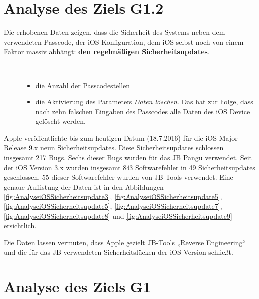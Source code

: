  
\section{Analyse des Ziels G1.2}
\label{sec:AnalyseG12}


Die erhobenen Daten zeigen, dass die Sicherheit des Systems neben dem verwendeten Passcode, der iOS Konfiguration, dem iOS selbst noch von einem Faktor massiv abhängt: \textbf{den regelmäßigen Sicherheitsupdates}.  
\begin{description}
    \item[\parbox{\textwidth} {Bei der Konfiguration sind folgende Konfigurationsparameter anzuführen}]~\par
    \begin{itemize}
       \item die Anzahl der Passcodestellen
       \item die Aktivierung des Parameters \textit{\glqq Daten löschen\grqq{}}. Das hat zur Folge, dass nach zehn falschen Eingaben des Passcodes alle Daten des iOS Device gelöscht werden.
    \end{itemize}
\end{description} 

Apple veröffentlichte bis zum heutigen Datum (18.7.2016) für die iOS Major Release 9.x neun Sicherheitsupdates. Diese Sicherheitsupdates schlossen insgesamt 217 Bugs. Sechs dieser Bugs wurden für das JB Pangu verwendet.  Seit der iOS Version 3.x wurden insgesamt 843 Softwarefehler in 49 Sicherheitsupdates geschlossen. 55 dieser Softwarefehler wurden von JB-Tools verwendet. Eine genaue Auflistung der Daten ist in den Abbildungen \ref{fig:AnalyseiOSSicherheitsupdate3}, \ref{fig:AnalyseiOSSicherheitsupdate5}, \ref{fig:AnalyseiOSSicherheitsupdate5}, \ref{fig:AnalyseiOSSicherheitsupdate7}, \ref{fig:AnalyseiOSSicherheitsupdate8} und \ref{fig:AnalyseiOSSicherheitsupdate9} ersichtlich.

Die Daten lassen vermuten, dass Apple gezielt JB-Tools „Reverse Engineering“ und die für das JB verwendeten Sicherheitslücken der iOS Version schließt.
\section{Analyse des Ziels G1}
\label{sec:AnalyseG1}

